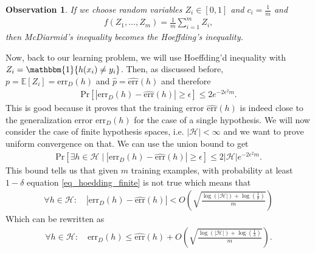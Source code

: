 \documentclass[10pt ]{article}
\newtheorem{obs}{Observation}
\begin{document}
\begin{obs}{\em
If we choose random variables $Z_i \in [0,1]$ and $c_i = \frac{1}{m}$ and 
\begin{align}
f(Z_1,\dots,Z_m) = \frac{1}{m} \sum_{i=1}^m Z_i,
\end{align}
then McDiarmid's inequality becomes the Hoeffding's inequality. 
}\end{obs}

Now, back to our learning problem, we will use Hoeffding'd inequality with $Z_i = \mathbbm{1} \{h(x_i) \neq y_i\}$. Then, as discussed before,  $p=\mathbb{E} [ Z_i ] = \mathrm{err}_D(h)$ and $\hat{p} = \widehat{\mathrm{err}}(h)$ and therefore
\begin{align}
\mathrm{Pr} \left[| \mathrm{err}_D(h) -   \widehat{\mathrm{err}}(h) | \ge \epsilon \right] \le 2 e^{-2\epsilon^2 m}.
\end{align}
This is good because it proves that the training error $\widehat{\mathrm{err}}(h)$ is indeed close to the generalization error $\mathrm{err}_D(h)$ for the case of a single hypothesis. We will now consider the case of finite hypothesis spaces, i.e. $|\mathcal{H}|<\infty$ and we want to prove uniform convergence on that. We can use the union bound to get 
\begin{align}
\mathrm{Pr} \left[ \exists h \in \mathcal{H} \mid | \mathrm{err}_D(h) -   \widehat{\mathrm{err}}(h) | \ge \epsilon \right] \le 2 |\mathcal{H}| e^{-2\epsilon^2 m}.
\label{eq_hoedding_finite}
\end{align}
This bound tells us that given $m$ training examples, with probability at least $1-\delta$ equation \eqref{eq_hoedding_finite} is not true which means that 
\begin{align}
\forall h \in \mathcal{H}: \quad | \mathrm{err}_D(h) -   \widehat{\mathrm{err}}(h) | < O \left( \sqrt{\frac{\log(|\mathcal{H}|) + \log(\frac{1}{\delta})}{m}}\right)
\end{align}
Which can be rewritten as 
\begin{align}
\forall h \in \mathcal{H}: \quad \mathrm{err}_D(h) \le  \widehat{\mathrm{err}}(h)  + O \left( \sqrt{\frac{\log(|\mathcal{H}|) + \log(\frac{1}{\delta})}{m}}\right).
\label{eq_bound_training_err_gen_err}
\end{align}
\end{document}
